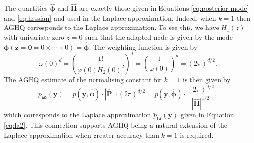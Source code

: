 \documentclass[a4paper, nobind]{templates/ociamthesis}
\begin{document}
The quantities \(\hat{\boldsymbol{\mathbf{\phi}}}\) and \(\hat{\boldsymbol{\mathbf{H}}}\) are exactly those given in Equations \eqref{eq:posterior-mode} and \eqref{eq:hessian} and used in the Laplace approximation.
Indeed, when \(k = 1\) then AGHQ corresponds to the Laplace approximation.
To see this, we have \(H_1(z)\) with univariate zero \(z = 0\) such that the adapted node is given by the mode \(\boldsymbol{\mathbf{\phi}}(\mathbf{z} = \mathbf{0} = 0 \times \cdots \times 0) = \hat{\boldsymbol{\mathbf{\phi}}}\).
The weighting function is given by
\begin{equation}
\omega(0)^d = \left( \frac{1!}{\varphi(0) H_{2}(0)^2} \right)^d = \left( \frac{1}{\varphi(0)} \right)^d = \left(2 \pi\right)^{d / 2}.
\end{equation}
The AGHQ estimate of the normalising constant for \(k = 1\) is then given by
\begin{equation}
\tilde p_{\texttt{AQ}}(\mathbf{y}) = p(\mathbf{y}, \hat{\boldsymbol{\mathbf{\phi}}}) \cdot | \hat{\mathbf{P}} | \cdot (2 \pi)^{d / 2} = p(\mathbf{y}, \hat{\boldsymbol{\mathbf{\phi}}}) \cdot \frac{(2 \pi)^{d / 2}}{| \hat{\mathbf{H}} | ^{1/2}},
\end{equation}
which corresponds to the Laplace approximation \(\tilde p_{\texttt{LA}}(\mathbf{y})\) given in Equation \eqref{eq:la2}.
This connection supports AGHQ being a natural extension of the Laplace approximation when greater accuracy than \(k = 1\) is required.
\end{document}
